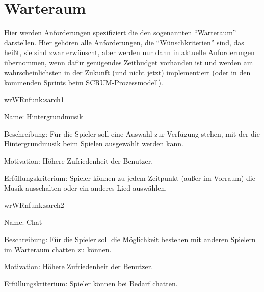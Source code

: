 \chapter{Warteraum}

Hier werden Anforderungen spezifiziert die den sogenannten ``Warteraum'' darstellen. Hier gehören alle Anforderungen, die ``Wünschkriterien'' sind, das heißt, sie sind zwar erwünscht, aber werden nur dann in aktuelle Anforderungen übernommen, wenn dafür genügendes Zeitbudget vorhanden ist und werden am wahrscheinlichsten in der Zukunft (und nicht jetzt) implementiert (oder in den kommenden Sprints beim SCRUM-Prozessmodell).

\setcounter{wr}{10}

\begin{description}[leftmargin=5em, style=sameline]	
	\begin{lhp}{wr}{WR}{nfunk:sarch1}
		\item [Name:] Hintergrundmusik
		\item [Beschreibung:] Für die Spieler soll eine Auswahl zur Verfügung stehen, mit der die Hintergrundmusik beim Spielen ausgewählt werden kann.
		\item [Motivation:] Höhere Zufriedenheit der Benutzer.
		\item [Erfüllungskriterium:] Spieler können zu jedem Zeitpunkt (außer im Vorraum) die Musik ausschalten oder ein anderes Lied auswählen.
	\end{lhp}
	
	\begin{lhp}{wr}{WR}{nfunk:sarch2}
		\item [Name:] Chat
		\item [Beschreibung:] Für die Spieler soll die Möglichkeit bestehen mit anderen Spielern im Warteraum chatten zu können.
		\item [Motivation:] Höhere Zufriedenheit der Benutzer.
		\item [Erfüllungskriterium:] Spieler können bei Bedarf chatten.
	\end{lhp}
	
\end{description}